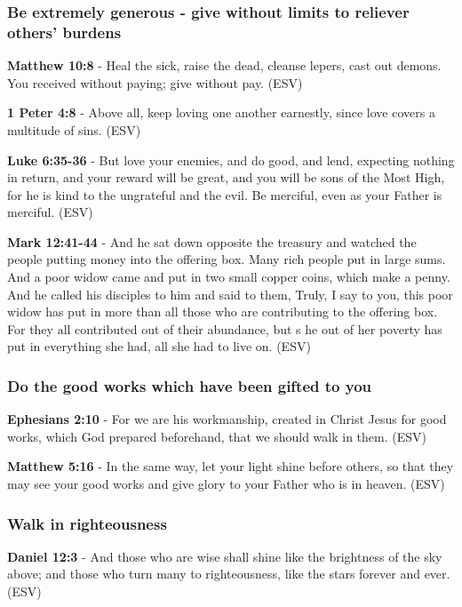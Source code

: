 \documentclass[11pt]{article}
\begin{document}
\subsubsection{Be extremely generous - give without limits to reliever others' burdens}
\label{sec:org74194e5}
\textbf{Matthew 10:8} - Heal the sick, raise the dead, cleanse lepers, cast out demons. You received without paying; give without pay. (ESV)

\textbf{1 Peter 4:8} -  Above all, keep loving one another earnestly, since love covers a multitude of sins.  (ESV)

\textbf{Luke 6:35-36} -  But love your enemies, and do good, and lend, expecting nothing in return, and your reward will be great, and you will be sons of the Most High, for he is kind to the ungrateful and the evil.  Be merciful, even as your Father is merciful.  (ESV)

\textbf{Mark 12:41-44} -  And he sat down opposite the treasury and watched the people putting money into the offering box.  Many rich people put in large sums.  And a poor widow came and put in two small copper coins, which make a penny.  And he called his disciples to him and said to them, Truly, I say to you, this poor widow has put in more than all those who are contributing to the offering box.  For they all contributed out of their abundance, but s he out of her poverty has put in everything she had, all she had to live on.  (ESV)

\subsubsection{Do the good works which have been gifted to you}
\label{sec:orgbd4ed59}
\textbf{Ephesians 2:10} - For we are his workmanship, created in Christ Jesus for good works, which God prepared beforehand, that we should walk in them.  (ESV)

\textbf{Matthew 5:16} - In the same way, let your light shine before others, so that they may see your good works and give glory to your Father who is in heaven.  (ESV)

\subsubsection{Walk in righteousness}
\label{sec:orga4a3333}

\textbf{Daniel 12:3} -  And those who are wise shall shine like the brightness of the sky above; and those who turn many to righteousness, like the stars forever and ever.  (ESV)
\end{document}
